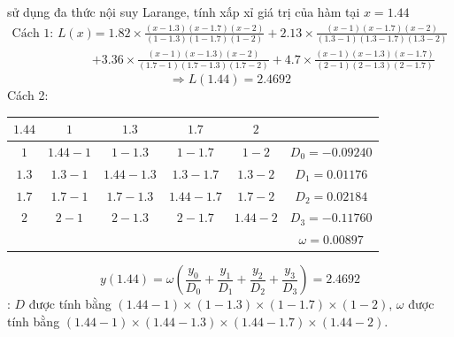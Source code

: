 \documentclass[12pt, a4paper]{report}
\begin{document}
sử dụng đa thức nội suy Larange, tính xấp xỉ giá trị của hàm tại $x=1.44$
\[
    \begin{aligned}
\text{Cách 1: }    L(x) &= 1.82 \times \frac{(x-1.3)(x-1.7)(x-2)}{(1-1.3)(1-1.7)(1-2)} + 2.13 \times \frac{(x-1)(x-1.7)(x-2)}{(1.3-1)(1.3-1.7)(1.3-2)} \\
               &+ 3.36 \times \frac{(x-1)(x-1.3)(x-2)}{(1.7-1)(1.7-1.3)(1.7-2)} + 4.7 \times \frac{(x-1)(x-1.3)(x-1.7)}{(2-1)(2-1.3)(2-1.7)}
    \end{aligned}
\]
\[
    \Rightarrow L(1.44) = 2.4692    
\]
Cách 2:
\begin{table}[h]
    \centering
    \begin{tabular}{c|cccc|c}
    {\color[HTML]{FF0000} $1.44$} & $1$                             & $1.3$                             & $1.7$                             & $2$                             &                                           \\ \hline
    $1$                           & {\color[HTML]{FF0000} $1.44-1$} & $1-1.3$                           & $1-1.7$                           & $1-2$                           & $D_0 = -0.09240$                          \\
    $1.3$                         & $1.3-1$                         & {\color[HTML]{FF0000} $1.44-1.3$} & $1.3-1.7$                         & $1.3-2$                         & $D_1 = 0.01176$                           \\
    $1.7$                         & $1.7-1$                         & $1.7-1.3$                         & {\color[HTML]{FF0000} $1.44-1.7$} & $1.7-2$                         & $D_2 =0.02184 $                           \\
    $2$                           & $2-1$                           & $2-1.3$                           & $2-1.7$                           & {\color[HTML]{FF0000} $1.44-2$} & $D_3 = -0.11760$                          \\ \hline
                                  &                                 &                                   &                                   &                                 & {\color[HTML]{000000} $\omega = 0.00897$}
    \end{tabular}
\end{table}
\[
    y(1.44) = \omega \left( \frac{y_0}{D_0} + \frac{y_1}{D_1} + \frac{y_2}{D_2} + \frac{y_3}{D_3} \right) = 2.4692
\]
: $D$ được tính bằng $(1.44-1)\times(1-1.3)\times(1-1.7)\times(1-2)$, $\omega$ được tính bằng $(1.44-1)\times(1.44-1.3)\times(1.44-1.7)\times(1.44-2)$.
\end{document}
